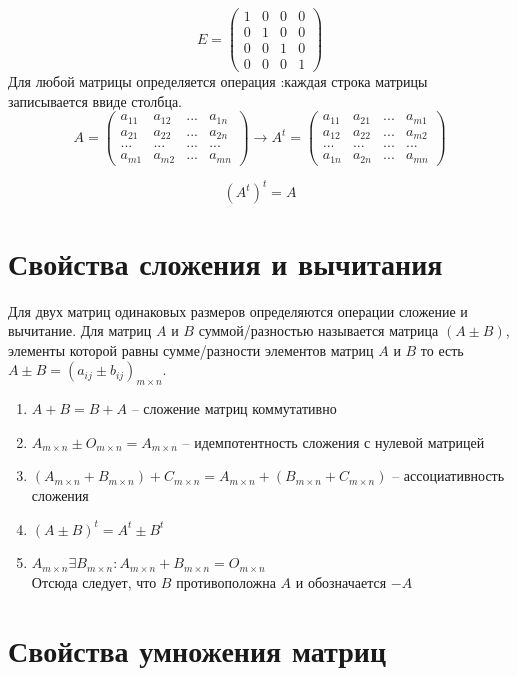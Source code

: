 \documentclass[oneside]{book}
\begin{document}
\begin{enumerate}
\begin{itemize}
\begin{enumerate}
$$ E =\begin{pmatrix} 1 & 0 & 0 & 0\\
0 & 1 & 0 & 0\\ 
0 & 0 & 1 & 0\\
0 & 0 & 0 & 1\end{pmatrix}$$
Для любой матрицы определяется операция :каждая строка матрицы записывается ввиде столбца.
$$A=\begin{pmatrix} a_{1 1} & a_{1 2} & ... & a_{1 n}\\
a_{2 1} & a_{2 2} & ... & a_{2 n}\\ 
... & ... & ... & ...\\
a_{m 1} & a_{m 2} & ... & a_{m n}\end{pmatrix}
\to A^{t}=\begin{pmatrix} a_{1 1} & a_{2 1} & ... & a_{m 1}\\
a_{1 2} & a_{2 2} & ... & a_{m 2}\\ 
... & ... & ... & ...\\
a_{1 n} & a_{2 n} & ... & a_{m n}\end{pmatrix}$$

$$(A^{t})^{t}=A$$
\section{Свойства сложения и вычитания}
Для двух матриц одинаковых размеров определяются операции сложение и вычитание. Для матриц $A$ и $B$ суммой/разностью называется матрица $(A\pm B)$, элементы которой равны сумме/разности элементов матриц $A$ и $B$ то есть $A\pm B=(a_{i j}\pm b_{i j})_{m\times n}$.
\begin{enumerate}
\item $A+B=B+A$ -- сложение матриц коммутативно
\item $A_{m\times n}\pm O_{m\times n}=A_{m\times n}$ -- идемпотентность сложения с нулевой матрицей
\item $(A_{m\times n}+B_{m\times n})+C_{m\times n}=A_{m\times n}+(B_{m\times n}+C_{m\times n})$ -- ассоциативность сложения
\item $(A\pm B)^{t}=A^{t}\pm B^{t}$
\item $A_{m\times n} \exists B_{m\times n}: A_{m\times n}+B_{m\times n}= O_{m\times n}$\\
Отсюда следует, что $B$ противоположна $A$ и обозначается $-A$
\end{enumerate}

\section{Свойства умножения матриц}

\end{enumerate}
\end{itemize}
\end{enumerate}
\end{document}
